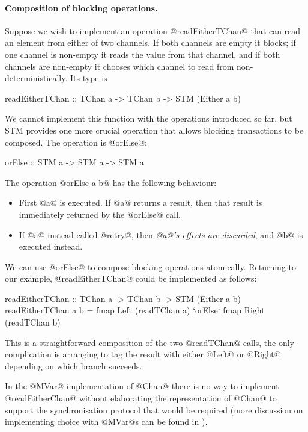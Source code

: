 \paragraph{Composition of blocking operations.}  Suppose we wish to
implement an operation @readEitherTChan@ that can read an element from
either of two channels.  If both channels are empty it blocks; if one
channel is non-empty it reads the value from that channel, and if both
channels are non-empty it chooses which channel to read from
non-deterministically.  Its type is

\begin{haskell}
readEitherTChan :: TChan a -> TChan b -> STM (Either a b)
\end{haskell}

\noindent We cannot implement this function with the operations
introduced so far, but STM provides one more crucial operation that
allows blocking transactions to be composed.  The operation is
@orElse@:

\begin{haskell}
orElse :: STM a -> STM a -> STM a
\end{haskell}

\noindent The operation @orElse a b@ has the following behaviour:

\begin{itemize}
\item First @a@ is executed.  If @a@ returns a result, then that
  result is immediately returned by the @orElse@ call.
\item If @a@ instead called @retry@, then \emph{@a@'s effects are
  discarded}, and @b@ is executed instead.
\end{itemize}

We can use @orElse@ to compose blocking operations atomically.
Returning to our example, @readEitherTChan@ could be implemented as
follows:

\begin{haskell}
readEitherTChan :: TChan a -> TChan b -> STM (Either a b)
readEitherTChan a b =
  fmap Left (readTChan a)
    `orElse`
  fmap Right (readTChan b)
\end{haskell}

\noindent This is a straightforward composition of the two @readTChan@ calls,
the only complication is arranging to tag the result with either
@Left@ or @Right@ depending on which branch succeeds.

In the @MVar@ implementation of @Chan@ there is no way to implement
@readEitherChan@ without elaborating the representation of @Chan@ to
support the synchronisation protocol that would be required (more
discussion on implementing choice with @MVar@s can be found in
\citet{jones96concurrent}).

